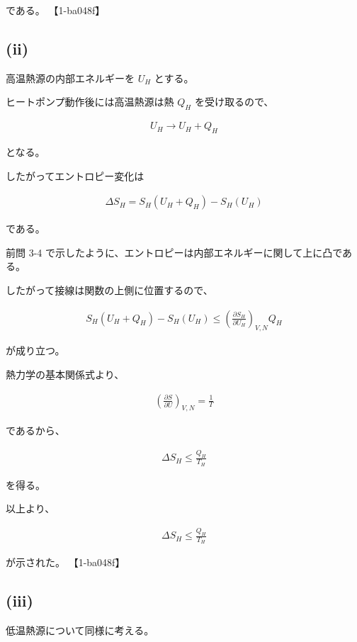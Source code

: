 \documentclass[platex,dvipdfmx,a4paper]{jsarticle}
\begin{document}
である。 【1-ba048f】

\subsection{(ii)}

高温熱源の内部エネルギーを $U_H$ とする。

ヒートポンプ動作後には高温熱源は熱 $Q_H$ を受け取るので、

\begin{align*}
U_H
\rightarrow
U_H+Q_H
\end{align*}

となる。

したがってエントロピー変化は

\begin{align*}
\Delta S_H
=
S_H(U_H+Q_H)-S_H(U_H)
\end{align*}

である。

前問 3-4 で示したように、エントロピーは内部エネルギーに関して上に凸である。

したがって接線は関数の上側に位置するので、

\begin{align*}
S_H(U_H+Q_H)
-
S_H(U_H)
\le
\left(
\frac{\partial S_H}{\partial U_H}
\right)_{V,N}
Q_H
\end{align*}

が成り立つ。

熱力学の基本関係式より、

\begin{align*}
\left(
\frac{\partial S}{\partial U}
\right)_{V,N}
=
\frac1T
\end{align*}

であるから、

\begin{align*}
\Delta S_H
\le
\frac{Q_H}{T_H}
\end{align*}

を得る。

以上より、

\begin{align*}
\Delta S_H
\le
\frac{Q_H}{T_H}
\end{align*}

が示された。 【1-ba048f】

\subsection{(iii)}

低温熱源について同様に考える。
\end{document}

